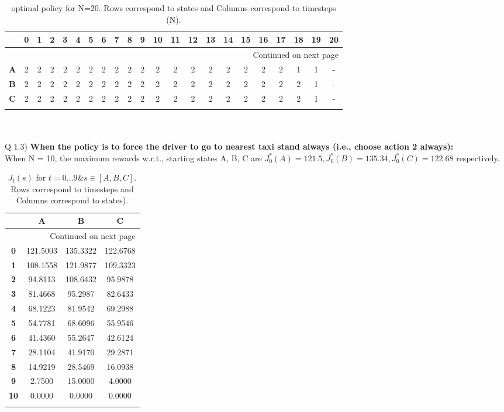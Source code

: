 \documentclass{article}
\begin{document}
\begin{longtable}{|c|c|c|c|c|c|c|c|c|c|c|c|c|c|c|c|c|c|c|c|c|c|}
\toprule
{} &  0  &  1  &  2  &  3  &  4  &  5  &  6  &  7  &  8  &  9  &  10 &  11 &  12 &  13 &  14 &  15 &  16 &  17 &  18 &  19 & 20 \\
\midrule
\endhead
\midrule
\multicolumn{22}{r}{{Continued on next page}} \\
\midrule
\endfoot

\bottomrule
\endlastfoot
\textbf{A} &   2 &   2 &   2 &   2 &   2 &   2 &   2 &   2 &   2 &   2 &   2 &   2 &   2 &   2 &   2 &   2 &   2 &   2 &   1 &   1 &  - \\
\textbf{B} &   2 &   2 &   2 &   2 &   2 &   2 &   2 &   2 &   2 &   2 &   2 &   2 &   2 &   2 &   2 &   2 &   2 &   2 &   2 &   1 &  - \\
\textbf{C} &   2 &   2 &   2 &   2 &   2 &   2 &   2 &   2 &   2 &   2 &   2 &   2 &   2 &   2 &   2 &   2 &   2 &   2 &   2 &   1 &  - \\\hline
\caption{optimal policy for N=20. Rows correspond to states and Columns correspond to timesteps (N).}
\end{longtable}
~\\\\

Q 1.3) \textbf{When the policy is to force the driver to go to nearest taxi stand always (i.e., choose action 2 always):}\\

When N = 10, the maximum rewards w.r.t., starting states A, B, C are $J_0^*(A) = 121.5, J_0^*(B) = 135.34, J_0^*(C) = 122.68$ respectively.\\


\begin{longtable}{|c|c|c|c|}
\toprule
{} &         A &         B &         C \\
\midrule
\endhead
\midrule
\multicolumn{4}{r}{{Continued on next page}} \\
\midrule
\endfoot

\bottomrule
\endlastfoot
\textbf{0 } &  121.5003 &  135.3322 &  122.6768 \\\hline
\textbf{1 } &  108.1558 &  121.9877 &  109.3323 \\\hline
\textbf{2 } &   94.8113 &  108.6432 &   95.9878 \\\hline
\textbf{3 } &   81.4668 &   95.2987 &   82.6433 \\\hline
\textbf{4 } &   68.1223 &   81.9542 &   69.2988 \\\hline
\textbf{5 } &   54.7781 &   68.6096 &   55.9546 \\\hline
\textbf{6 } &   41.4360 &   55.2647 &   42.6124 \\\hline
\textbf{7 } &   28.1104 &   41.9170 &   29.2871 \\\hline
\textbf{8 } &   14.9219 &   28.5469 &   16.0938 \\\hline
\textbf{9 } &    2.7500 &   15.0000 &    4.0000 \\\hline
\textbf{10} &    0.0000 &    0.0000 &    0.0000 \\\hline
\caption{$J_t(s)$ for $t=0 \dots 9 \& s \in [A, B, C]$. Rows correspond to timesteps and Columns correspond to states).}
\end{longtable}
\end{document}
